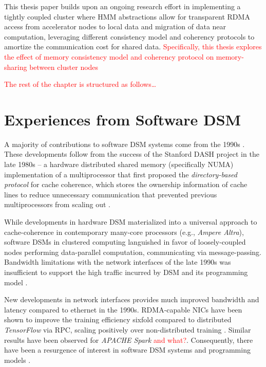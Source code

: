 \documentclass{article}
\begin{document}
This thesis paper builds upon an ongoing research effort in implementing a
tightly coupled cluster where HMM abstractions allow for transparent RDMA access
from accelerator nodes to local data and migration of data near computation,
leveraging different consistency model and coherency protocols to amortize the
communication cost for shared data. \textcolor{red}{
Specifically, this thesis explores the effect of memory consistency model and
coherency protocol on memory-sharing between cluster nodes }

\textcolor{red}{The rest of the chapter is structured as follows\dots}

\section{Experiences from Software DSM}
A majority of contributions to software DSM systems come from the 1990s
\cites{Amza_etal.Treadmarks.1996}{Carter_Bennett_Zwaenepoel.Munin.1991}
{Itzkovitz_Schuster_Shalev.Millipede.1998}{Hu_Shi_Tang.JIAJIA.1999}. These
developments follow from the success of the Stanford DASH project in the late
1980s -- a hardware distributed shared memory (specifically NUMA) implementation of a
multiprocessor that first proposed the \textit{directory-based protocol} for
cache coherence, which stores the ownership information of cache lines to reduce
unnecessary communication that prevented previous multiprocessors from scaling out
\cite{Lenoski_etal.Stanford_DASH.1992}.

While developments in hardware DSM materialized into a universal approach to
cache-coherence in contemporary many-core processors (e.g., \textit{Ampere
Altra}\cite{WEB.Ampere..Ampere_Altra_Datasheet.2023}), software DSMs in clustered
computing languished in favor of loosely-coupled nodes performing data-parallel
computation, communicating via message-passing. Bandwidth limitations with the
network interfaces of the late 1990s was insufficient to support the high traffic
incurred by DSM and its programming model
\cites{Werstein_Pethick_Huang.PerfAnalysis_DSM_MPI.2003}
{Lu_etal.MPI_vs_DSM_over_cluster.1995}.

New developments in network interfaces provides much improved bandwidth and latency
compared to ethernet in the 1990s. RDMA-capable NICs have been shown to improve
the training efficiency sixfold compared to distributed \textit{TensorFlow} via RPC,
scaling positively over non-distributed training \cite{Jia_etal.Tensorflow_over_RDMA.2018}.
Similar results have been observed for \textit{APACHE Spark}\cite{Lu_etal.Spark_over_RDMA.2014}
\textcolor{red}{and what?}. Consequently, there have been a resurgence of interest
in software DSM systems and programming models
\cites{Nelson_etal.Grappa_DSM.2015}{Cai_etal.Distributed_Memory_RDMA_Cached.2018}.
\end{document}
